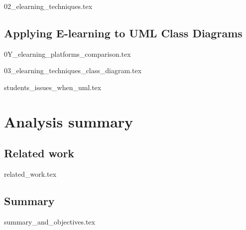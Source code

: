 
{02_elearning_techniques.tex}



\section{Applying E-learning to UML Class Diagrams}

{0Y_elearning_platforms_comparison.tex}

{03_elearning_techniques_class_diagram.tex}

{students_issues_when_uml.tex}


\chapter{Analysis summary}

\section{Related work}
{related_work.tex}

\section{Summary}
{summary_and_objectives.tex}

